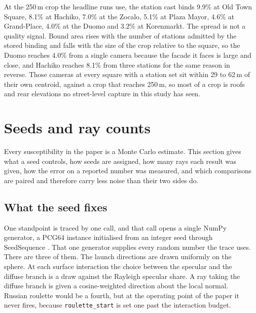 \documentclass[journal]{IEEEtran}
\begin{document}
At the 250\,m crop the headline runs use, the station cast binds 9.9\% at Old
Town Square, 8.1\% at Hachiko, 7.0\% at the Zocalo, 5.1\% at Plaza Mayor, 4.6\%
at Grand-Place, 4.0\% at the Duomo and 3.2\% at Korenmarkt. The spread is not a
quality signal. Bound area rises with the number of stations admitted by the
stored binding and falls
with the size of the crop relative to the square, so the Duomo reaches 4.0\%
from a single camera because the facade it faces is large and close, and Hachiko
reaches 8.1\% from three stations for the same reason in reverse. Those cameras
at every square with a station set sit within 29 to 62\,m of their own
centroid, against a crop that reaches 250\,m, so most of a crop is roofs and rear
elevations no street-level capture in this study has seen.

\section{Seeds and ray counts}
\label{sec:si-seeds}

Every susceptibility in the paper is a Monte Carlo estimate. This section gives
what a seed controls, how seeds are assigned, how many rays each result was
given, how the error on a reported number was measured, and which comparisons
are paired and therefore carry less noise than their two sides do.

\subsection{What the seed fixes}

One standpoint is traced by one call, and that call opens a single NumPy
generator, a PCG64 instance initialised from an integer seed through
SeedSequence \cite{numpy}. That one generator supplies every random number the
trace uses. There are three of them. The launch directions are drawn uniformly
on the sphere. At each surface interaction the choice between the specular and
the diffuse branch is a draw against the Rayleigh specular share. A ray taking
the diffuse branch is given a cosine-weighted direction about the local normal.
Russian roulette would be a fourth, but at the operating point of the paper it
never fires, because \texttt{roulette\_start} is set one past the interaction
budget.
\end{document}
